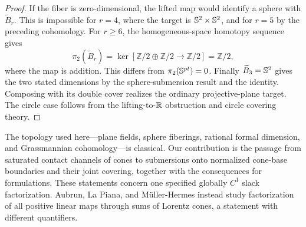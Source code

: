 \begin{proof}
If the fiber is zero-dimensional, the lifted map would identify a sphere
with $\widetilde B_r$. This is impossible for $r=4$, where the target is
$\mathbb S^2\times\mathbb S^2$, and for $r=5$ by the preceding cohomology.
For $r\geq6$, the homogeneous-space homotopy sequence gives
\[
 \pi_2(\widetilde B_r)
 =\ker[\mathbb Z/2\oplus\mathbb Z/2\longrightarrow\mathbb Z/2]
 =\mathbb Z/2,
\]
where the map is addition. This differs from $\pi_2(\mathbb S^{pt})=0$.
Finally $\widetilde B_3=\mathbb S^2$ gives the two stated dimensions by the
sphere-submersion result and the identity. Composing with its double
cover realizes the ordinary projective-plane target. The circle case
follows from the lifting-to-$\mathbb R$ obstruction and circle covering theory.
\end{proof}

The topology used here---plane fields, sphere fiberings, rational formal
dimension, and Grassmannian cohomology---is classical. Our contribution
is the passage from saturated contact channels of cones to submersions
onto normalized cone-base boundaries and their joint covering, together
with the consequences for formulations. These statements concern one
specified globally $C^1$ slack factorization. Aubrun, La Piana, and
M\"uller-Hermes \cite{ALM2026Lorentz} instead study factorization of all
positive linear maps through sums of Lorentz cones, a statement with
different quantifiers.
